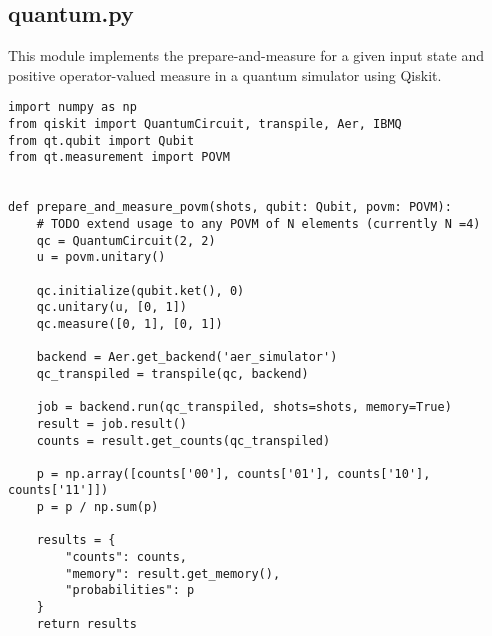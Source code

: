 \subsection{quantum.py}\label{section:listings_quantum}
This module implements the prepare-and-measure for a given input state and positive operator-valued measure in a quantum simulator using Qiskit. 
\begin{verbatim}
import numpy as np
from qiskit import QuantumCircuit, transpile, Aer, IBMQ
from qt.qubit import Qubit
from qt.measurement import POVM


def prepare_and_measure_povm(shots, qubit: Qubit, povm: POVM):
    # TODO extend usage to any POVM of N elements (currently N =4)
    qc = QuantumCircuit(2, 2)
    u = povm.unitary()

    qc.initialize(qubit.ket(), 0)
    qc.unitary(u, [0, 1])
    qc.measure([0, 1], [0, 1])

    backend = Aer.get_backend('aer_simulator')
    qc_transpiled = transpile(qc, backend)

    job = backend.run(qc_transpiled, shots=shots, memory=True)
    result = job.result()
    counts = result.get_counts(qc_transpiled)

    p = np.array([counts['00'], counts['01'], counts['10'], counts['11']])
    p = p / np.sum(p)

    results = {
        "counts": counts,
        "memory": result.get_memory(),
        "probabilities": p
    }
    return results
\end{verbatim}
\newpage
